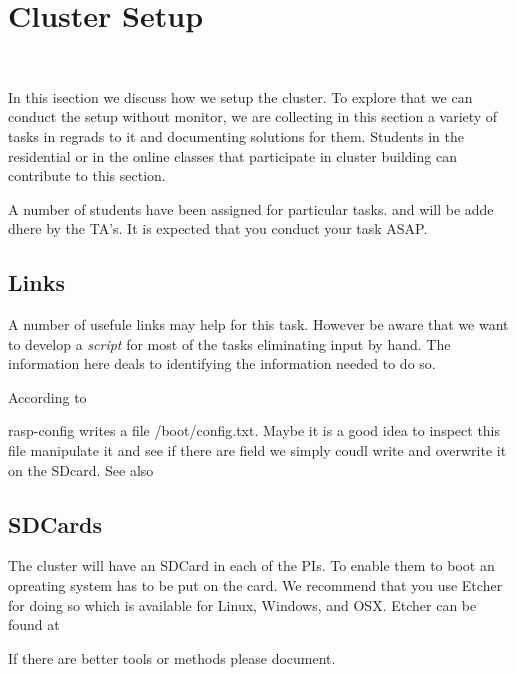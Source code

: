 \chapter{Cluster Setup}

\FILENAME\

In this isection we discuss how we setup the cluster. To explore that
we can conduct the setup without monitor, we are collecting in this
section a variety of tasks in regrads to it and documenting solutions
for them. Students in the residential or in the online classes that
participate in cluster building can contribute to this section.

A number of students have been assigned for particular tasks. and will
be adde dhere by the TA's. It is expected that you conduct your task ASAP.

\section{Links}

A number of usefule links may help for this task. However be aware
that we want to develop a \textit{script} for most of the tasks
eliminating input by hand. The information here deals to identifying
the information needed to do so.



According to 


rasp-config writes a file /boot/config.txt. Maybe it is a good idea to
inspect this file manipulate it and see if there are field we simply
coudl write and overwrite it on the SDcard. See also 



\section{SDCards}

The cluster will have an SDCard in each of the PIs. To enable them to
boot an opreating system has to be put on the card. We recommend that
you use Etcher for doing so which is available for Linux, Windows, and
OSX. Etcher can be found at 

If there are better tools or methods please document.

